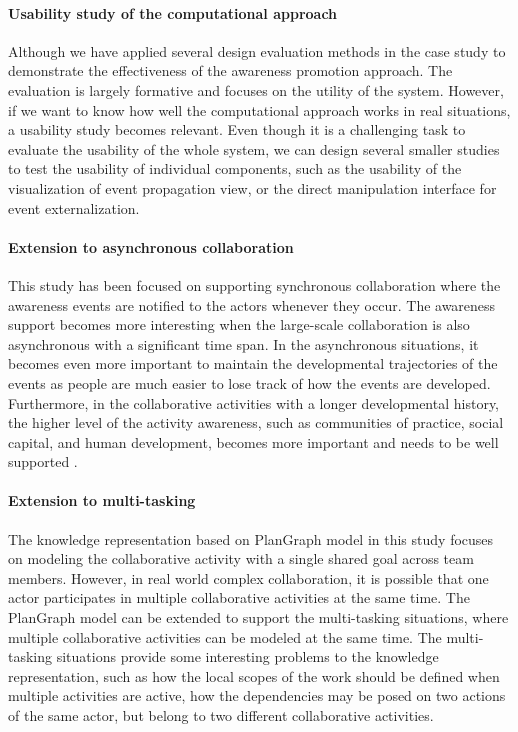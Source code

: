 \paragraph*{Usability study of the computational approach} %
\label{par:usability_study_of_the_prototype_system}
Although we have applied several design evaluation methods in the case study to demonstrate the effectiveness of the awareness promotion approach. The evaluation is largely formative and focuses on the utility of the system. However, if we want to know how well the computational approach works in real situations, a usability study becomes relevant. Even though it is a challenging task to evaluate the usability of the whole system, we can design several smaller studies to test the usability of individual components, such as the usability of the visualization of event propagation view, or the direct manipulation interface for event externalization.

\paragraph*{Extension to asynchronous collaboration} %
\label{par:extension_to_asynchronous_collaboration}
This study has been focused on supporting synchronous collaboration where the awareness events are notified to the actors whenever they occur. The awareness support becomes more interesting when the large-scale collaboration is also asynchronous with a significant time span. In the asynchronous situations, it becomes even more important to maintain the developmental trajectories of the events as people are much easier to lose track of how the events are developed. Furthermore, in the collaborative activities with a longer developmental history, the higher level of the activity awareness, such as communities of practice, social capital, and human development, becomes more important and needs to be well supported \cite{carroll2006a}.

\paragraph*{Extension to multi-tasking} %
\label{par:extension_to_multi_tasking}
The knowledge representation based on PlanGraph model in this study focuses on modeling the collaborative activity with a single shared goal across team members. However, in real world complex collaboration, it is possible that one actor participates in multiple collaborative activities at the same time. The PlanGraph model can be extended to support the multi-tasking situations, where multiple collaborative activities can be modeled at the same time. The multi-tasking situations provide some interesting problems to the knowledge representation, such as how the local scopes of the work should be defined when multiple activities are active, how the dependencies may be posed on two actions of the same actor, but belong to two different collaborative activities.




 

